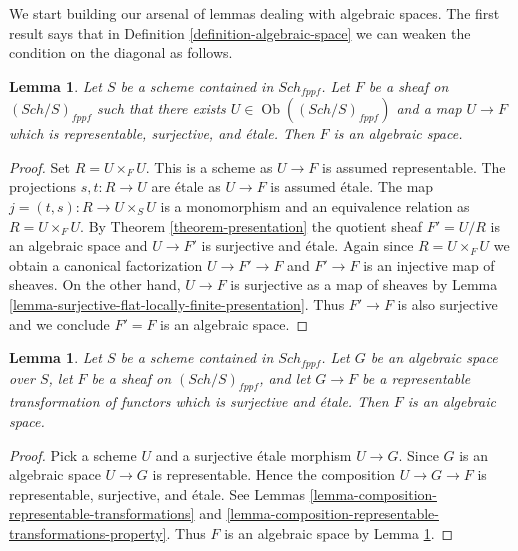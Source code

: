 \documentclass{stacks-project}
\theoremstyle{plain}
\newtheorem{lemma}[subsection]{Lemma}
\theoremstyle{definition}
\theoremstyle{remark}
\numberwithin{equation}{subsection}
\def\Sch{\mathit{Sch}}
\def\Ob{\mathop{\mathrm{Ob}}\nolimits}
\begin{document}
\noindent
We start building our arsenal of lemmas dealing with algebraic spaces.
The first result says that in Definition \ref{definition-algebraic-space}
we can weaken the condition on the diagonal as follows.

\begin{lemma}
\label{lemma-etale-locally-representable-gives-space}
Let $S$ be a scheme contained in $\Sch_{fppf}$.
Let $F$ be a sheaf on $(\Sch/S)_{fppf}$
such that there exists $U \in \Ob((\Sch/S)_{fppf})$ and a map
$U \to F$ which is representable, surjective, and \'etale.
Then $F$ is an algebraic space.
\end{lemma}

\begin{proof}
Set $R = U \times_F U$. This is a scheme as $U \to F$ is assumed representable.
The projections $s, t : R \to U$ are \'etale as $U \to F$ is assumed \'etale.
The map $j = (t, s) : R \to U \times_S U$ is a monomorphism and an equivalence
relation as $R = U \times_F U$. By Theorem \ref{theorem-presentation}
the quotient sheaf $F' = U/R$ is an algebraic space and $U \to F'$
is surjective and \'etale. Again since $R = U \times_F U$ we obtain
a canonical factorization $U \to F' \to F$ and $F' \to F$ is an injective
map of sheaves. On the other hand, $U \to F$ is surjective as a map
of sheaves by Lemma \ref{lemma-surjective-flat-locally-finite-presentation}.
Thus $F' \to F$ is also surjective and we conclude $F' = F$ is an
algebraic space.
\end{proof}

\begin{lemma}
\label{lemma-etale-locally-representable-by-space-gives-space}
Let $S$ be a scheme contained in $\Sch_{fppf}$. Let $G$ be an algebraic
space over $S$, let $F$ be a sheaf on $(\Sch/S)_{fppf}$, and let
$G \to F$ be a representable transformation of functors which is
surjective and \'etale. Then $F$ is an algebraic space.
\end{lemma}

\begin{proof}
Pick a scheme $U$ and a surjective \'etale morphism $U \to G$.
Since $G$ is an algebraic space $U \to G$ is representable.
Hence the composition $U \to G \to F$ is representable,
surjective, and \'etale. See Lemmas
\ref{lemma-composition-representable-transformations} and
\ref{lemma-composition-representable-transformations-property}.
Thus $F$ is an algebraic space by
Lemma \ref{lemma-etale-locally-representable-gives-space}.
\end{proof}
\end{document}
